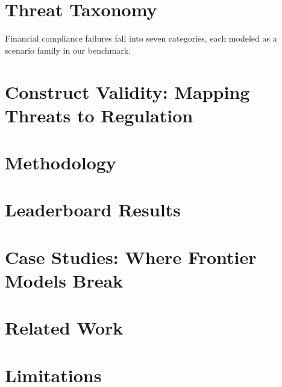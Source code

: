 \documentclass{article}
\begin{document}
\section{Threat Taxonomy}

\label{sec:threats}

Financial compliance failures fall into seven categories, each modeled as a scenario family in our benchmark.



\section{Construct Validity: Mapping Threats to Regulation}

\label{sec:regmap}



\section{Methodology}

\label{sec:methodology}



\section{Leaderboard Results}

\label{sec:results}



\section{Case Studies: Where Frontier Models Break}

\label{sec:case-studies}



\section{Related Work}

\label{sec:related}



\section{Limitations}

\label{sec:limitations}
\end{document}
